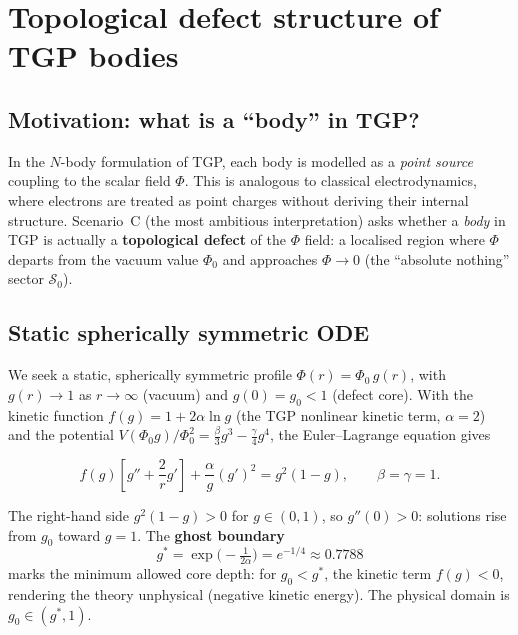 
\section{Topological defect structure of TGP bodies}
\label{sec:topological_defect}

\subsection{Motivation: what is a ``body'' in TGP?}

In the $N$-body formulation of TGP, each body is modelled as a
\emph{point source} coupling to the scalar field $\Phi$.  This is
analogous to classical electrodynamics, where electrons are treated as
point charges without deriving their internal structure.  Scenario~C
(the most ambitious interpretation) asks whether a \emph{body} in TGP
is actually a \textbf{topological defect} of the $\Phi$ field:
a localised region where $\Phi$ departs from the vacuum value
$\Phi_0$ and approaches $\Phi\to 0$ (the ``absolute nothing'' sector
$\mathcal{S}_0$).

\subsection{Static spherically symmetric ODE}

We seek a static, spherically symmetric profile
$\Phi(r) = \Phi_0\,g(r)$, with $g(r)\to 1$ as $r\to\infty$ (vacuum)
and $g(0)=g_0<1$ (defect core).  With the kinetic function
$f(g)=1+2\alpha\ln g$ (the TGP nonlinear kinetic term, $\alpha=2$)
and the potential
$V(\Phi_0 g)/\Phi_0^2 = \tfrac{\beta}{3}g^3 - \tfrac{\gamma}{4}g^4$,
the Euler--Lagrange equation gives

\begin{equation}
  f(g)\!\left[g'' + \frac{2}{r}g'\right]
  + \frac{\alpha}{g}(g')^2
  = g^2(1-g),
  \qquad \beta=\gamma=1.
\label{eq:defect_ode}
\end{equation}

The right-hand side $g^2(1-g)>0$ for $g\in(0,1)$, so $g''(0)>0$:
solutions rise from $g_0$ toward $g=1$.  The \textbf{ghost boundary}
\begin{equation}
  g^* = \exp\!\bigl(-\tfrac{1}{2\alpha}\bigr)
      = e^{-1/4} \approx 0.7788
\end{equation}
marks the minimum allowed core depth: for $g_0<g^*$, the kinetic term
$f(g)<0$, rendering the theory unphysical (negative kinetic energy).
The physical domain is $g_0\in(g^*,1)$.

